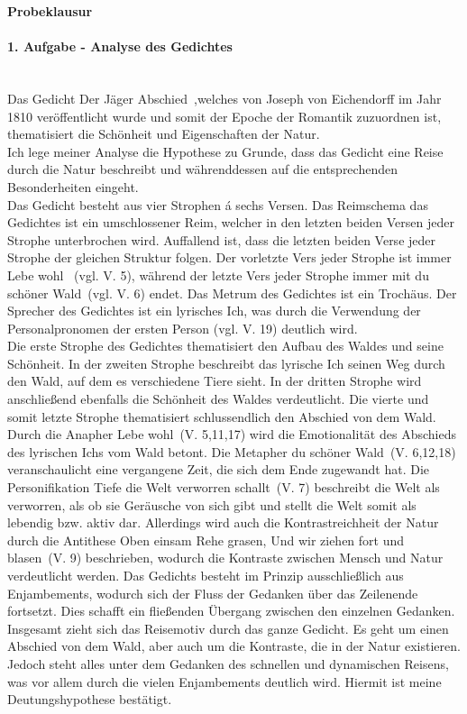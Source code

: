 \documentclass[11pt,a4paper]{report}
\begin{document}
	\centering
	\LARGE
	\textbf{Probeklausur}
	\normalsize
	\leftskip
	
	\paragraph{1. Aufgabe - Analyse des Gedichtes} \mbox{} \\
	Das Gedicht \dq Der Jäger Abschied\dq\ ,welches von Joseph von Eichendorff im Jahr 1810 veröffentlicht wurde und somit der Epoche der Romantik zuzuordnen ist, thematisiert die Schönheit und Eigenschaften der Natur. \\
	Ich lege meiner Analyse die Hypothese zu Grunde, dass das Gedicht eine Reise durch die Natur beschreibt und währenddessen auf die entsprechenden Besonderheiten eingeht. \\
	Das Gedicht besteht aus vier Strophen á sechs Versen.
	Das Reimschema das Gedichtes ist ein umschlossener Reim, welcher in den letzten beiden Versen jeder Strophe unterbrochen wird.
	Auffallend ist, dass die letzten beiden Verse jeder Strophe der gleichen Struktur folgen.
	Der vorletzte Vers jeder Strophe ist immer \dq Lebe wohl \dq\ (vgl. V. 5), während der letzte Vers jeder Strophe immer mit \dq du schöner Wald\dq\ (vgl. V. 6) endet.
	Das Metrum des Gedichtes ist ein Trochäus.
	Der Sprecher des Gedichtes ist ein lyrisches Ich, was durch die Verwendung der Personalpronomen der ersten Person (vgl. V. 19)  deutlich wird. \\
	Die erste Strophe des Gedichtes thematisiert den Aufbau des Waldes und seine Schönheit.
	In der zweiten Strophe beschreibt das lyrische Ich seinen Weg durch den Wald, auf dem es verschiedene Tiere sieht.
	In der dritten Strophe wird anschließend ebenfalls die Schönheit des Waldes verdeutlicht.
	Die vierte und somit letzte Strophe thematisiert schlussendlich den Abschied von dem Wald. \\
	Durch die Anapher \dq Lebe wohl\dq\ (V. 5,11,17) wird die Emotionalität des Abschieds des lyrischen Ichs vom Wald betont.
	Die Metapher \dq du schöner Wald\dq\ (V. 6,12,18) veranschaulicht eine vergangene Zeit, die sich dem Ende zugewandt hat.
	Die Personifikation \dq Tiefe die Welt verworren schallt\dq\ (V. 7) beschreibt die Welt als verworren, als ob sie Geräusche von sich gibt und stellt die Welt somit als lebendig bzw. aktiv dar.
	Allerdings wird auch die Kontrastreichheit der Natur durch die Antithese \dq Oben einsam Rehe grasen, Und wir ziehen fort und blasen\dq\ (V. 9) beschrieben, wodurch die Kontraste zwischen Mensch und Natur verdeutlicht werden.
	Das Gedichts besteht im Prinzip ausschließlich aus Enjambements, wodurch sich der Fluss der Gedanken über das Zeilenende fortsetzt.
	Dies schafft ein fließenden Übergang zwischen den einzelnen Gedanken. \\
	Insgesamt zieht sich das Reisemotiv durch das ganze Gedicht.
	Es geht um einen Abschied von dem Wald, aber auch um die Kontraste, die in der Natur existieren.
	Jedoch steht alles unter dem Gedanken des schnellen und dynamischen Reisens, was vor allem durch die vielen Enjambements deutlich wird.
	Hiermit ist meine Deutungshypothese bestätigt.
	
\end{document}
